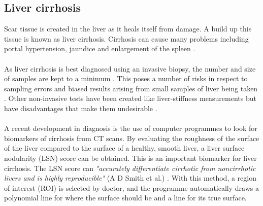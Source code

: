 \documentclass[12pt]{article}
\begin{document}
\subsection{Liver cirrhosis}
Scar tissue is created in the liver as it heals itself from damage. A build up this tissue is known as liver cirrhosis. Cirrhosis can cause many problems including portal hypertension, jaundice and enlargement of the spleen \cite{mayo_clinic}. 
\\ \\
As liver cirrhosis is best diagnosed using an invasive biopsy, the number and size of samples are kept to a minimum \cite{Huang:2007aa}. This poses a number of risks in respect to sampling errors and biased results arising from small samples of liver being taken \cite{Huber:2015aa}. Other non-invasive tests have been created like liver-stiffness measurements but have disadvantages that make them undesirable \cite{Smith:2016aa}. 
\\ \\
A recent development in diagnosis is the use of computer programmes to look for biomarkers of cirrhosis from CT scans. By evaluating the roughness of the surface of the liver compared to the surface of a healthy, smooth liver, a liver surface nodularity (LSN) score can be obtained. This is an important biomarker for liver cirrhosis. The LSN score can \textit{"accurately differentiate cirrhotic from noncirrhotic livers
and is highly reproducible"} (A D Smith et al.) \cite{Smith:2016aa}. With this method, a region of interest (ROI) is selected by doctor, and the programme automatically draws a polynomial line for where the surface should be and a line for its true surface.  
\end{document}
